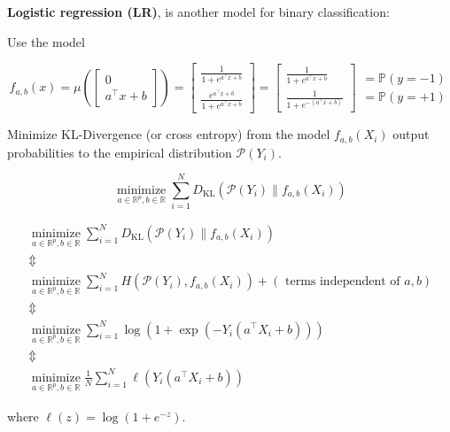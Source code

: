 \begin{definition}
    \textbf{Logistic regression (LR)}, is another model for binary classification:

    Use the model

    $$
    f_{a, b}(x)=
    \mu\left(\left[\begin{array}{c}0 \\
    a^{\top} x+b
    \end{array}\right]\right)
    = \left[\begin{array}{c}
    \frac{1}{1+e^{a^{\top} x+b}} \\
    \frac{e^{a^{\top} x+b}}{1+e^{a^{\top} x+b}}
    \end{array}\right]=\left[\begin{array}{c}
    \frac{1}{1+e^{a^{\top} x+b}} \\
    \frac{1}{1+e^{-\left(a^{\top} x+b\right)}}
    \end{array}\right]\begin{array}{c}
    = \mathbb{P}(y=-1) \\
    = \mathbb{P}(y=+1)
    \end{array}
    $$

    Minimize KL-Divergence (or cross entropy) from the model $f_{a, b}\left(X_{i}\right)$ output probabilities to the empirical distribution $\mathcal{P}\left(Y_{i}\right)$.

    $$
    \underset{a \in \mathbb{R}^{p}, b \in \mathbb{R}}{\operatorname{minimize}} \sum_{i=1}^{N} D_{\mathrm{KL}}\left(\mathcal{P}\left(Y_{i}\right) \| f_{a, b}\left(X_{i}\right)\right)
    $$
\end{definition}

\begin{concept}
    $$
    \begin{gathered}
    \underset{a \in \mathbb{R}^{p}, b \in \mathbb{R}}{\operatorname{minimize}} \sum_{i=1}^{N} D_{\mathrm{KL}}\left(\mathcal{P}\left(Y_{i}\right) \| f_{a, b}\left(X_{i}\right)\right) \\
    \mathbb{\Updownarrow} \\
    \underset{a \in \mathbb{R}^{p}, b \in \mathbb{R}}{\operatorname{minimize}} \sum_{i=1}^{N} H\left(\mathcal{P}\left(Y_{i}\right), f_{a, b}\left(X_{i}\right)\right)+(\text { terms independent of } a, b) \\
    \mathbb{\Updownarrow} \\
    \underset{a \in \mathbb{R}^{p}, b \in \mathbb{R}}{\operatorname{minimize}} \sum_{i=1}^{N} \log \left(1+\exp \left(-Y_{i}\left(a^{\top} X_{i}+b\right)\right)\right) \\
    \mathbb{\Updownarrow} \\
    \underset{a \in \mathbb{R}^{p}, b \in \mathbb{R}}{\operatorname{minimize}} \frac{1}{N} \sum_{i=1}^{N} \ell\left(Y_{i}\left(a^{\top} X_{i}+b\right)\right)
    \end{gathered}
    $$

    where $\ell(z)=\log \left(1+e^{-z}\right)$.
\end{concept}

